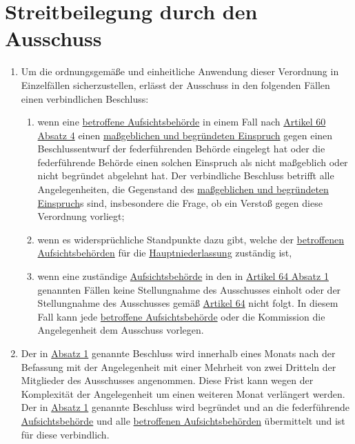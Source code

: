 \chapter{Streitbeilegung durch den Ausschuss}
\label{ch:65}


\begin{enumerate}

  \item Um die ordnungsgemäße und einheitliche Anwendung dieser Verordnung in Einzelfällen sicherzustellen, erlässt der
   Ausschuss in den folgenden Fällen einen verbindlichen Beschluss:
  \label{itm:65-1}

  \begin{enumerate}
  
    \item wenn eine \hyperref[itm:04-22]{betroffene Aufsichtsbehörde} in einem Fall nach \hyperref[itm:60-4]{Artikel 60
     Absatz 4} einen
     \hyperref[itm:04-27]{maßgeblichen und begründeten Einspruch} gegen einen Beschlussentwurf der federführenden
      Behörde eingelegt hat oder die federführende Behörde einen solchen Einspruch als nicht maßgeblich oder nicht
      begründet abgelehnt hat. Der verbindliche Beschluss betrifft alle Angelegenheiten, die Gegenstand des \hyperref
      [itm:04-27]{maßgeblichen und begründeten Einspruch}s sind, insbesondere die Frage, ob ein Verstoß gegen diese
      Verordnung vorliegt;
    \label{itm:65-1a}

    \item wenn es widersprüchliche Standpunkte dazu gibt, welche der \hyperref[itm:04-22]{betroffenen Aufsichtsbehörden}
     für die
     \hyperref[itm:04-16]{Hauptniederlassung} zuständig ist,
    \label{itm:65-1b}

    \item wenn eine zuständige \hyperref[itm:04-21]{Aufsichtsbehörde} in den in \hyperref[itm:64-1]{Artikel 64 Absatz 1}
     genannten Fällen keine Stellungnahme des Ausschusses einholt oder der Stellungnahme des Ausschusses
     gemäß \hyperref[ch:64]{Artikel 64} nicht folgt. In diesem Fall kann jede \hyperref[itm:04-22]
     {betroffene Aufsichtsbehörde} oder die Kommission die Angelegenheit dem Ausschuss vorlegen.
    \label{itm:65-1c}

  \end{enumerate}

  \item Der in \hyperref[itm:65-1]{Absatz 1} genannte Beschluss wird innerhalb eines Monats nach der Befassung mit der
   Angelegenheit mit einer Mehrheit von zwei Dritteln der Mitglieder des Ausschusses angenommen. Diese Frist kann wegen
   der Komplexität der Angelegenheit um einen weiteren Monat verlängert werden. Der in \hyperref[itm:65-1]{Absatz 1}
   genannte Beschluss wird begründet und an die federführende \hyperref[itm:04-21]{Aufsichtsbehörde} und alle \hyperref
   [itm:04-22]{betroffenen Aufsichtsbehörden} übermittelt und ist für diese verbindlich.
  \label{itm:65-2}


\end{enumerate}
